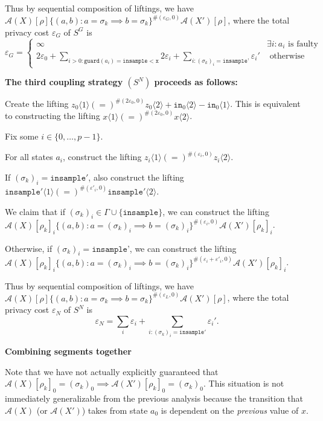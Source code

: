 \documentclass[12pt]{article}
\newcommand{\lguard}[1][x]{\texttt{insample} < \texttt{#1}}
\newcommand{\brangle}[1]{\langle #1 \rangle}
\newcommand{\guard}{\texttt{guard}}
\theoremstyle{definition}
\begin{document}
Thus by sequential composition of liftings, we have $\mathcal{A}(X)[\rho]\{(a, b): a = \sigma_k \implies b = \sigma_k\}^{\#(\varepsilon_G, 0)}\mathcal{A}(X')[\rho]$, where the total privacy cost $\varepsilon_G$ of $S^G$ is \[
	\varepsilon_G= 
	\begin{cases}
		\infty & \exists i: a_i\text{ is faulty}\\
		2\varepsilon_0 + \sum_{i>0: \guard(a_i) = \lguard} 2\varepsilon_i  + \sum_{i: (\sigma_k)_i = \texttt{insample'}}\varepsilon_i'& \text{ otherwise}
	\end{cases}
\]

\textbf{The third coupling strategy $(S^N)$ proceeds as follows:}


Create the lifting $z_0\brangle{1} (=)^{\#(2\varepsilon_0, 0)} z_0\brangle{2} + \texttt{in}_0\brangle{2}- \texttt{in}_0\brangle{1}$. This is equivalent to constructing the lifting $x\brangle{1} (=)^{\#(2\varepsilon_0, 0)}x\brangle{2}$. 

Fix some $i\in\{0, \ldots, p-1\}$. 

For all states $a_i$, construct the lifting $z_i\brangle{1} (=)^{\#(\varepsilon_i, 0)}z_i\brangle{2}$.

If $(\sigma_k)_i=\texttt{insample}'$, also construct the lifting $\texttt{insample}'\brangle{1} (=)^{\#(\varepsilon'_i, 0)} \texttt{insample}'\brangle{2}$.

We claim that if $(\sigma_k)_i \in \Gamma\cup\{\texttt{insample}\}$, we can construct the lifting $\mathcal{A}(X)[\rho_k]_i\{(a, b): a = (\sigma_k)_i \implies b = (\sigma_k)_i\}^{\#(\varepsilon_i, 0)}\mathcal{A}(X')[\rho_k]_i$.

Otherwise, if $(\sigma_k)_i =\texttt{insample'}$, we can construct the lifting $\mathcal{A}(X)[\rho_k]_i\{(a, b): a = (\sigma_k)_i \implies b = (\sigma_k)_i\}^{\#(\varepsilon_i+\varepsilon'_i, 0)}\mathcal{A}(X')[\rho_k]_i$.

Thus by sequential composition of liftings, we have $\mathcal{A}(X)[\rho]\{(a, b): a = \sigma_k \implies b = \sigma_k\}^{\#(\varepsilon_L, 0)}\mathcal{A}(X')[\rho]$, where the total privacy cost $\varepsilon_N$ of $S^N$ is \[
	\varepsilon_N= \sum_{i} \varepsilon_i  + \sum_{i: (\sigma_k)_i = \texttt{insample}'}\varepsilon_i'.
\]

\textbf{Combining segments together}

Note that we have not actually explicitly guaranteed that $\mathcal{A}(X)[\rho_k]_0 = (\sigma_k)_0 \implies \mathcal{A}(X')[\rho_k]_0 = (\sigma_k)_0$. This situation is not immediately generalizable from the previous analysis because the transition that $\mathcal{A}(X)$ (or $\mathcal{A}(X')$) takes from state $a_0$ is dependent on the \textit{previous} value of $x$. 
\end{document}
